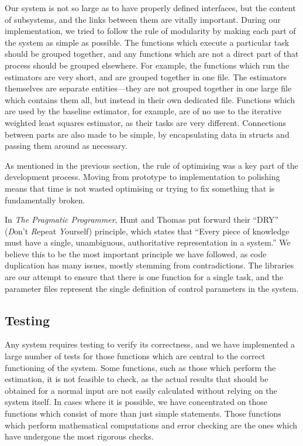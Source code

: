 \documentclass[a4paper,11pt]{article}
\begin{document}
   Our system is not so large as to have properly defined interfaces, but the
   content of subsystems, and the links between them are vitally
   important. During our implementation, we tried to follow the rule of
   modularity by making each part of the system as simple as possible. The
   functions which execute a particular task should be grouped together, and any
   functions which are not a direct part of that process should be grouped
   elsewhere. For example, the functions which run the estimators are very
   short, and are grouped together in one file. The estimators themselves are
   separate entities---they are not grouped together in one large file which
   contains them all, but instead in their own dedicated file. Functions which
   are used by the baseline estimator, for example, are of no use to the
   iterative weighted least squares estimator, as their tasks are very
   different. Connections between parts are also made to be simple, by
   encapsulating data in structs and passing them around as necessary.

   As mentioned in the previous section, the rule of optimising was a key part
   of the development process. Moving from prototype to implementation to
   polishing means that time is not wasted optimising or trying to fix something
   that is fundamentally broken.

   In \emph{The Pragmatic Programmer}, Hunt and Thomas put forward their ``DRY''
   (\emph{D}on't \emph{R}epeat \emph{Y}ourself) principle, which states that
   ``Every piece of knowledge must have a single, unambiguous, authoritative
   representation in a system.'' We believe this to be the most important
   principle we have followed, as code duplication has many issues, mostly
   stemming from contradictions. The libraries are our attempt to ensure that
   there is one function for a single task, and the parameter files represent
   the single definition of control parameters in the system.
\subsection{Testing}
\label{sec-4-3}

   Any system requires testing to verify its correctness, and we have
   implemented a large number of tests for those functions which are central to
   the correct functioning of the system. Some functions, such as those which
   perform the estimation, it is not feasible to check, as the actual results
   that should be obtained for a normal input are not easily calculated without
   relying on the system itself. In cases where it is possible, we have
   concentrated on those functions which consist of more than just simple
   statements. Those functions which perform mathematical computations and error
   checking are the ones which have undergone the most rigorous checks.
\end{document}
